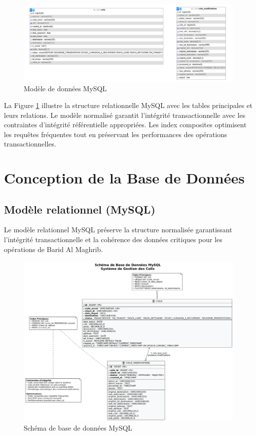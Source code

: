 \begin{figure}[H]
\centering
\includegraphics[width=1.0\textwidth]{images/data_model_mysql.png}
\caption{Modèle de données MySQL}
\label{fig:data_model_mysql}
\end{figure}
La Figure \ref{fig:data_model_mysql} illustre la structure relationnelle MySQL avec les tables principales et leurs relations. Le modèle normalisé garantit l'intégrité transactionnelle avec les contraintes d'intégrité référentielle appropriées. Les index composites optimisent les requêtes fréquentes tout en préservant les performances des opérations transactionnelles.

\section{Conception de la Base de Données}

\subsection{Modèle relationnel (MySQL)}

Le modèle relationnel MySQL préserve la structure normalisée garantissant l'intégrité transactionnelle et la cohérence des données critiques pour les opérations de Barid Al Maghrib.

\begin{figure}[H]
\centering
\includegraphics[width=1.0\textwidth]{images/mysql_schema.png}
\caption{Schéma de base de données MySQL}
\label{fig:mysql_schema}
\end{figure}


